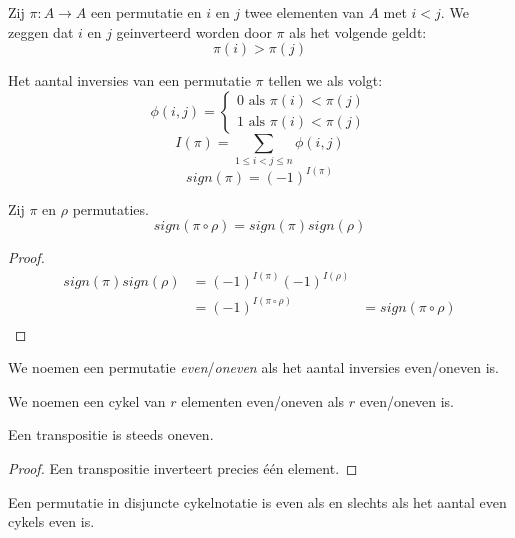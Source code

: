 \documentclass[main.tex]{subfiles}
\begin{document}
\begin{de}
  Zij $\pi: A \rightarrow A$ een permutatie en $i$ en $j$ twee elementen van $A$ met $i < j$.
  We zeggen dat $i$ en $j$ geinverteerd worden door $\pi$ als het volgende geldt:
  \[ \pi(i) > \pi(j) \]
\end{de}

\begin{de}
  Het aantal inversies van een permutatie $\pi$ tellen we als volgt:
  \[
  \phi(i,j) =
  \left\{
  \begin{array}{lc}
    0 \text{ als } \pi(i) < \pi(j)\\
    1 \text{ als } \pi(i) < \pi(j)
  \end{array}
  \right.
  \]
  \[ I(\pi) = \sum_{1\le i < j \le n}\phi(i,j) \]
  \[ sign(\pi) = (-1)^{I(\pi)}\] 
\end{de}

\begin{ei}
  Zij $\pi$ en $\rho$ permutaties.
  \[ sign(\pi\circ\rho) = sign(\pi)sign(\rho) \] 
  \begin{proof}
    \[
    \begin{array}{rll}
      sign(\pi)sign(\rho) &= (-1)^{I(\pi)} (-1)^{I(\rho)} &\\
                          &= (-1)^{I(\pi\circ\rho)}      &=sign(\pi\circ\rho)\\
    \end{array}
    \]
  \end{proof}
\end{ei}

\begin{de}
  We noemen een permutatie \emph{even}/\emph{oneven} als het aantal inversies even/oneven is.
\end{de}

\begin{de}
  We noemen een cykel van $r$ elementen even/oneven als $r$ even/oneven is.
\end{de}

\begin{st}
  Een transpositie is steeds oneven.
  \begin{proof}
    Een transpositie inverteert precies \'e\'en element.
  \end{proof}
\end{st}

\begin{st}
  Een permutatie in disjuncte cykelnotatie is even als en slechts als het aantal even cykels even is.

\end{st}
\end{document}
